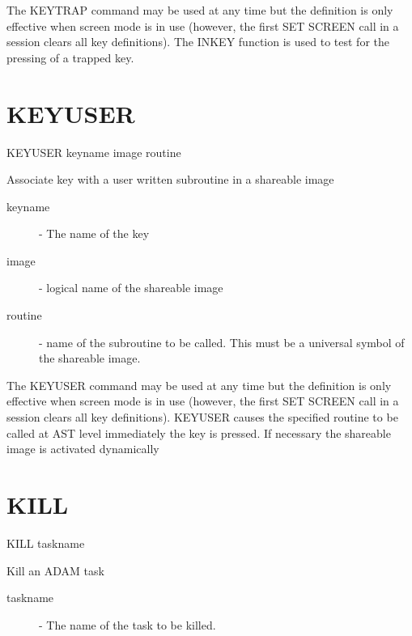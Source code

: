 The KEYTRAP command may be used at any time but the definition is only
effective when screen mode is in use (however, the first SET SCREEN call
in a session clears all key definitions). The INKEY function is used to test
for the pressing of a trapped key.

\section{KEYUSER}

    KEYUSER  \hspace{.5cm} keyname  \hspace{.5cm} image \hspace{.5cm} routine
         
 Associate key with a user written subroutine in a shareable image

\begin{description}

\item[keyname] -  The name of the key

\item[image] - logical name of the shareable image 
                                     
\item[routine] - name of the subroutine to be called. This must be a universal
symbol of the shareable image.

\end{description}
                                     
The KEYUSER command may be used at any time but the definition is only
effective when screen mode is in use (however, the first SET SCREEN call
in a session clears all key definitions). KEYUSER causes the specified routine
to be called at AST level immediately the key is pressed. If necessary the
shareable image is activated dynamically

\section{KILL}

    KILL \hspace{.5cm} taskname

 Kill an ADAM task

\begin{description}

\item[taskname] -  The name of the task to be killed.

\end{description}

